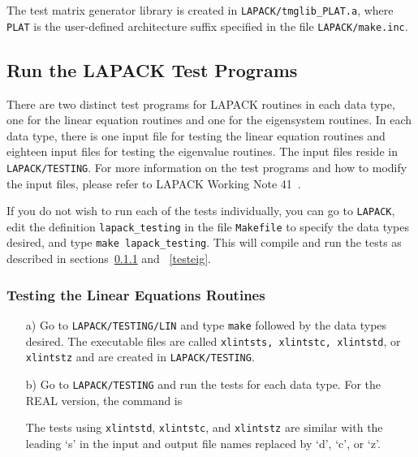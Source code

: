 \documentclass[11pt]{report}
\begin{document}
\noindent
The test matrix generator library is created in \texttt{LAPACK/tmglib\_PLAT.a},
where \texttt{PLAT} is the user-defined architecture suffix specified in the 
file \texttt{LAPACK/make.inc}.

\subsection{Run the LAPACK Test Programs}

There are two distinct test programs for LAPACK routines
in each data type, one for the linear equation routines and
one for the eigensystem routines.
In each data type, there is one input file for testing the linear
equation routines and eighteen input files for testing the eigenvalue
routines.
The input files reside in \texttt{LAPACK/TESTING}.
For more information on the test programs and how to modify the
input files, please refer to LAPACK Working Note 41~\cite{WN41}.

If you do not wish to run each of the tests individually, you can
go to \texttt{LAPACK}, edit the definition \texttt{lapack\_testing} in the file
\texttt{Makefile} to specify the data types desired, and type \texttt{make
lapack\_testing}.  This will
compile and run the tests as described in sections~\ref{testlin} 
and ~\ref{testeig}.

 
\subsubsection{Testing the Linear Equations Routines}\label{testlin}

\begin{itemize}

\item[a)]
Go to \texttt{LAPACK/TESTING/LIN} and type \texttt{make} followed by the data types
desired.  The executable files are called \texttt{xlintsts, xlintstc,
xlintstd}, or \texttt{xlintstz} and are created in \texttt{LAPACK/TESTING}.

\item[b)]
Go to \texttt{LAPACK/TESTING} and run the tests for each data type.
For the REAL version, the command is

\noindent
The tests using \texttt{xlintstd}, \texttt{xlintstc}, and \texttt{xlintstz} are similar
with the leading `s' in the input and output file names replaced
by `d', `c', or `z'.

\end{itemize}
\end{document}
